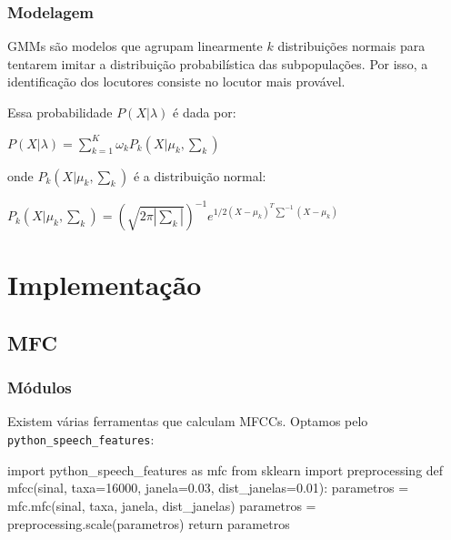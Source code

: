 \documentclass{beamer}
\begin{document}
\begin{frame}[fragile] %
    \frametitle{Modelagem}

    GMMs são modelos que agrupam linearmente $k$ distribuições normais para tentarem imitar a distribuição probabilística das subpopulações. Por isso, a identificação dos locutores consiste no locutor mais provável.

    \medskip

    Essa probabilidade $P(X|\lambda)$ é dada por:

    \bigskip

    \begin{math}
        P(X|\lambda) = \sum_{k=1}^{K} \omega_{k} P_{k}(X|\mu_{k}, \sum_{k})
    \end{math}

    \bigskip

    onde $P_{k}(X|\mu_{k}, \sum_{k})$ é a distribuição normal:

    \bigskip

    \begin{math}
        P_{k}(X|\mu_{k}, \sum_{k}) = (\sqrt{2\pi|\sum_{k}|})^{-1}e^{1/2(X-\mu_{k})^{T}\sum^{-1}(X-\mu_{k})}
    \end{math}

\end{frame}


\section{Implementação}

\subsection{MFC}

\begin{frame}[fragile] %
    \frametitle{Módulos}

    Existem várias ferramentas que calculam MFCCs. Optamos pelo \texttt{python\_speech\_features}:

    \bigskip
    \begin{python}
import python_speech_features as mfc
from sklearn import preprocessing
def mfcc(sinal, taxa=16000, janela=0.03, dist_janelas=0.01):
    parametros = mfc.mfc(sinal, taxa, janela, dist_janelas)
    parametros = preprocessing.scale(parametros)
    return parametros
    \end{python}

\end{frame}
\end{document}
